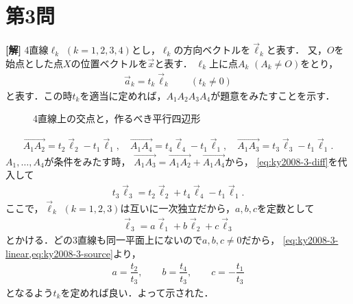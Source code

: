 \documentclass[../main.tex]{subfiles}
\begin{document}
\section*{第3問}

{\bf [解]}
4直線$\ell_k$ $(k=1,2,3,4)$とし，$\ell_k$の方向ベクトルを$\vec{\ell}_k$と表す．
又，$O$を始点とした点$X$の位置ベクトルを$\vec{x}$と表す．
$\ell_k$上に点$A_k$ $(A_k\ne O)$をとり，
\begin{align}\vec{a}_k=t_k\vec{\ell}_k\qquad(t_k\ne0)
\end{align}
と表す．この時$t_k$を適当に定めれば，$A_1A_2A_3A_4$が題意をみたすことを示す．
\begin{figure}[H]
  \begin{center}
  \end{center}
  \caption{4直線上の交点と，作るべき平行四辺形}
\end{figure}
\begin{align}
  \overrightarrow{A_1A_2}=t_2\vec{\ell}_2-t_1\vec{\ell}_1,\quad
  \overrightarrow{A_1A_4}=t_4\vec{\ell}_4-t_1\vec{\ell}_1,\quad
  \overrightarrow{A_1A_3}=t_3\vec{\ell}_3-t_1\vec{\ell}_1.
  \label{eq:ky2008-3-diff}
\end{align}
$A_1,\ldots,A_4$が条件をみたす時，
$\overrightarrow{A_1A_3}=\overrightarrow{A_1A_2}+\overrightarrow{A_1A_4}$から，
\cref{eq:ky2008-3-diff}を代入して
\begin{align}
  t_3\vec{\ell}_3=t_2\vec{\ell}_2+t_4\vec{\ell}_4-t_1\vec{\ell}_1.
  \label{eq:ky2008-3-linear}
\end{align}
ここで，$\vec{\ell}_k$ $(k=1,2,3)$は互いに一次独立だから，$a,b,c$を定数として
\begin{align}
  \vec{\ell}_3=a\vec{\ell}_1+b\vec{\ell}_2+c\vec{\ell}_3
  \label{eq:ky2008-3-source}
\end{align}
とかける．どの3直線も同一平面上にないので$a,b,c\ne0$だから，
\cref{eq:ky2008-3-linear,eq:ky2008-3-source}より，
\begin{align}a=\dfrac{t_2}{t_3},\qquad b=\dfrac{t_4}{t_3},\qquad c=-\dfrac{t_1}{t_3}
\end{align}
となるよう$t_k$を定めれば良い．よって示された．
\newpage
\end{document}
